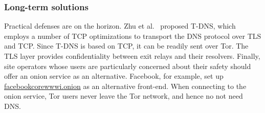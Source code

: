 \subsubsection{Long-term solutions}
\label{sec:long-term}
Practical defenses are on the horizon.  Zhu et al.~\cite{Zhu2015a} proposed
T-DNS, which employs a number of TCP optimizations to transport the DNS protocol
over TLS and TCP.  Since T-DNS is based on TCP, it can be readily sent over Tor.
The TLS layer provides confidentiality between exit relays and their resolvers.
Finally, site operators whose users are particularly concerned about their
safety should offer an onion service as an alternative.  Facebook, for example,
set up \url{facebookcorewwwi.onion} as an alternative front-end.  When
connecting to the onion service, Tor users never leave the Tor network, and
hence no not need DNS.
